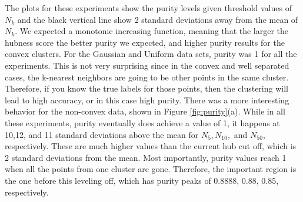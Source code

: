 \documentclass[graybox]{svmult}
\begin{document}
The plots for these experiments show the purity levels given threshold values of $N_k$ and the black vertical line show 2 standard deviations away from the mean of $N_k$. We expected a monotonic increasing function, meaning that the larger the hubness score the better purity we expected, and higher purity results for the convex clusters. For the Gaussian and Uniform data sets, purity was 1 for all the experiments. This is not very surprising since in the convex and well separated cases, the k-nearest neighbors are going to be other points in the same cluster. Therefore, if you know the true labels for those points, then the clustering will lead to high accuracy, or in this case high purity. There was a more interesting behavior for the non-convex data, shown in Figure \ref{fig:purity}(a). While in all these experiments, purity eventually does achieve a value of 1, it happens at 10,12, and 11 standard deviations above the mean for $N_{5}, N_{10},$ and $N_{50}$, respectively. These are much higher values than the current hub cut off, which is 2 standard deviations from the mean. Most importantly, purity values reach 1 when all the points from one cluster are gone. Therefore, the important region is the one before this leveling off, which has purity peaks of 0.8888, 0.88, 0.85, respectively.
\end{document}
